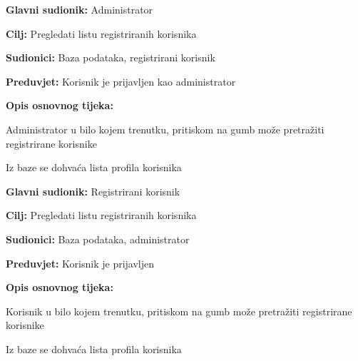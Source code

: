 \begin{packed_item}
	
	\item \textbf{Glavni sudionik: }Administrator
	\item  \textbf{Cilj:} Pregledati listu registriranih korisnika
	\item  \textbf{Sudionici:} Baza podataka, registrirani korisnik
	\item  \textbf{Preduvjet:} Korisnik je prijavljen kao administrator
	\item  \textbf{Opis osnovnog tijeka:}
	
	\item[] \begin{packed_enum}
		
		\item Administrator u bilo kojem trenutku, pritiskom na gumb može pretražiti registrirane korisnike
		\item Iz baze se dohvaća lista profila korisnika
	\end{packed_enum}
\end{packed_item}

\noindent {}
\begin{packed_item}
	
	\item \textbf{Glavni sudionik: }Registrirani korisnik
	\item  \textbf{Cilj:} Pregledati listu registriranih korisnika
	\item  \textbf{Sudionici:} Baza podataka, administrator
	\item  \textbf{Preduvjet:} Korisnik je prijavljen
	\item  \textbf{Opis osnovnog tijeka:}
	
	\item[] \begin{packed_enum}
		
		\item Korisnik u bilo kojem trenutku, pritiskom na gumb može pretražiti registrirane korisnike
		\item Iz baze se dohvaća lista profila korisnika
	\end{packed_enum}
\end{packed_item}

